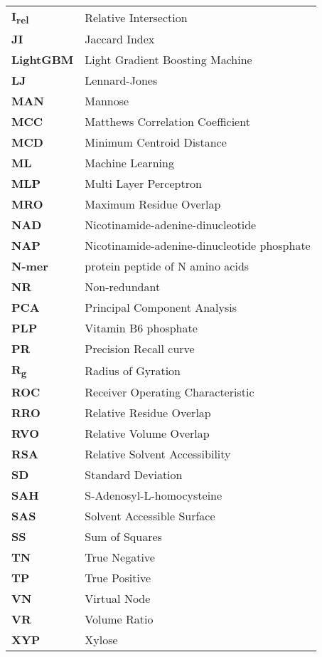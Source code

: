 \begin{longtable}[l]{@{}p{2.5cm}p{12cm}@{}}
\textbf{I\textsubscript{rel}} & Relative Intersection \\
\textbf{JI} & Jaccard Index \\
\textbf{LightGBM} & Light Gradient Boosting Machine \\
\textbf{LJ} & Lennard-Jones \\
\textbf{MAN} & Mannose \\
\textbf{MCC} & Matthews Correlation Coefficient \\
\textbf{MCD} & Minimum Centroid Distance \\
\textbf{ML} & Machine Learning \\
\textbf{MLP} & Multi Layer Perceptron \\
\textbf{MRO} & Maximum Residue Overlap \\
\textbf{NAD} & Nicotinamide-adenine-dinucleotide \\
\textbf{NAP} & Nicotinamide-adenine-dinucleotide phosphate \\
\textbf{N-mer} & protein peptide of N amino acids \\
\textbf{NR} & Non-redundant \\
\textbf{PCA} & Principal Component Analysis \\
\textbf{PLP} & Vitamin B6 phosphate \\
\textbf{PR} & Precision Recall curve \\
\textbf{R\textsubscript{g}} & Radius of Gyration \\
\textbf{ROC} & Receiver Operating Characteristic \\
\textbf{RRO} & Relative Residue Overlap \\
\textbf{RVO} & Relative Volume Overlap \\
\textbf{RSA} & Relative Solvent Accessibility \\
\textbf{SD} & Standard Deviation \\
\textbf{SAH} & S-Adenosyl-L-homocysteine \\
\textbf{SAS} & Solvent Accessible Surface \\
\textbf{SS} & Sum of Squares \\
\textbf{TN} & True Negative \\
\textbf{TP} & True Positive \\
\textbf{VN} & Virtual Node \\
\textbf{VR} & Volume Ratio \\
\textbf{XYP} & Xylose \\

\end{longtable}
